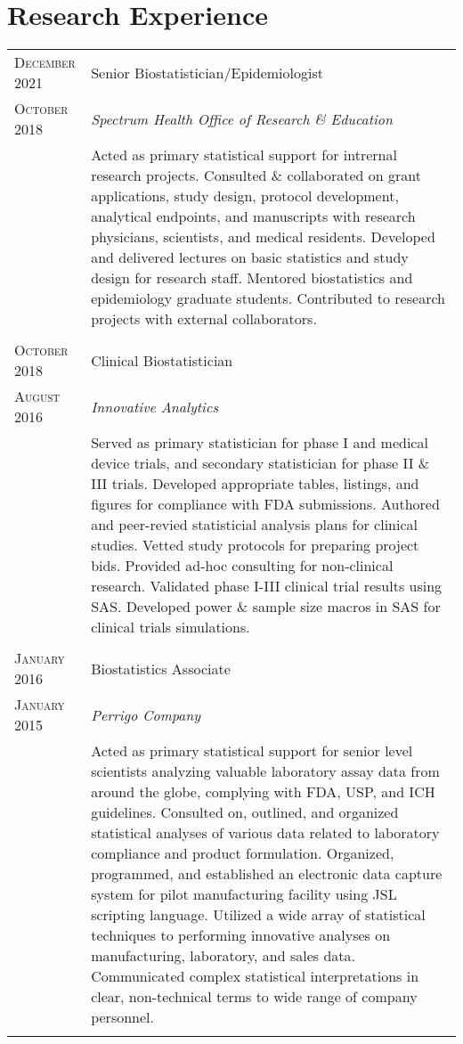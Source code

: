 \documentclass[a4paper,10pt]{article}
\begin{document}
\section{Research Experience}
\begin{tabular}{>{\raggedleft\arraybackslash}p{2.8cm}|p{12cm}}

 \textsc{December 2021} & Senior Biostatistician/Epidemiologist \\
 \textsc{October 2018}&\emph{Spectrum Health Office of Research \& Education}\\&
 \footnotesize{Acted as primary statistical support for intrernal research projects. Consulted \& collaborated on grant applications, study design, protocol development, analytical endpoints, and manuscripts with research physicians, scientists, and medical residents. Developed and delivered lectures on basic statistics and study design for research staff. Mentored biostatistics and epidemiology graduate students. Contributed to research projects with external collaborators. }\\\multicolumn{2}{c}{} \\
 
 
 
 \textsc{October 2018} & Clinical Biostatistician \\ 
 \textsc{August 2016} &\emph{Innovative Analytics}\\ &
 \footnotesize{Served as primary statistician for phase I and medical device trials, and secondary statistician for phase II \& III trials. Developed appropriate tables, listings, and figures for compliance with FDA submissions. Authored and peer-revied statisticial analysis plans for clinical studies. Vetted study protocols for preparing project bids. Provided ad-hoc consulting for non-clinical research. Validated phase I-III clinical trial results using SAS. Developed power \& sample size macros in SAS for clinical trials simulations.}\\\multicolumn{2}{c}{} \\
 
  
 \textsc{January 2016} & Biostatistics Associate \\ 
 \textsc{January 2015} &\emph{Perrigo Company}\\&
 \footnotesize{ Acted as primary statistical support for senior level scientists analyzing valuable laboratory assay
data from around the globe, complying with FDA, USP, and ICH guidelines. Consulted on, outlined, and organized statistical analyses of various data related to laboratory
compliance and product formulation. Organized, programmed, and established an electronic data capture system for pilot manufacturing
facility using JSL scripting language. Utilized a wide array of statistical techniques to performing innovative analyses on manufacturing,
laboratory, and sales data. Communicated complex statistical interpretations in clear, non-technical terms to wide range of
company personnel.}\\\multicolumn{2}{c}{} \\
 
\end{tabular}
\end{document}
